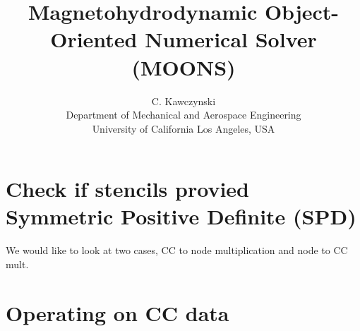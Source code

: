 \documentclass[landscape]{article}
\begin{document}
\doublespacing
\title{Magnetohydrodynamic Object-Oriented Numerical Solver (MOONS)}
\author{C. Kawczynski \\
Department of Mechanical and Aerospace Engineering \\
University of California Los Angeles, USA\\
}

\section{Check if stencils provied Symmetric Positive Definite (SPD)}

We would like to look at two cases, CC to node multiplication and node to CC mult.

\section{Operating on CC data}
\end{document}
